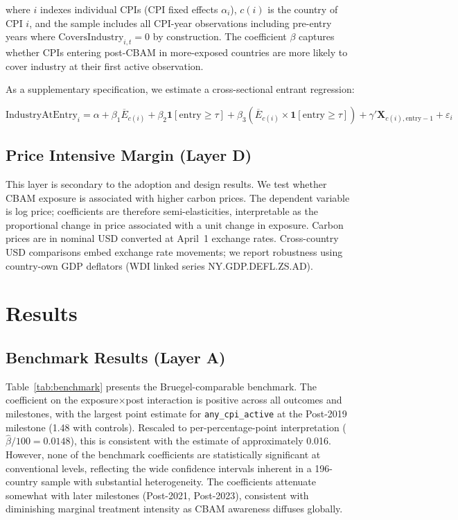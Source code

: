 \documentclass[12pt,a4paper]{article}
\begin{document}
\noindent where $i$ indexes individual CPIs (CPI fixed effects $\alpha_i$), $c(i)$ is the country of CPI $i$, and the sample includes all CPI-year observations including pre-entry years where $\text{CoversIndustry}_{i,t} = 0$ by construction. The coefficient $\beta$ captures whether CPIs entering post-CBAM in more-exposed countries are more likely to cover industry at their first active observation.

As a supplementary specification, we estimate a cross-sectional entrant regression:

\begin{equation}
\text{IndustryAtEntry}_i = \alpha + \beta_1 \overline{E}_{c(i)} + \beta_2 \mathbf{1}[\text{entry} \geq \tau] + \beta_3 \left( \overline{E}_{c(i)} \times \mathbf{1}[\text{entry} \geq \tau] \right) + \gamma' \mathbf{X}_{c(i),\text{entry}-1} + \varepsilon_i
\label{eq:entrant}
\end{equation}

\subsection{Price Intensive Margin (Layer D)}\label{sec:price_spec}

This layer is secondary to the adoption and design results. We test whether CBAM exposure is associated with higher carbon prices. The dependent variable is log price; coefficients are therefore semi-elasticities, interpretable as the proportional change in price associated with a unit change in exposure. Carbon prices are in nominal USD converted at April~1 exchange rates. Cross-country USD comparisons embed exchange rate movements; we report robustness using country-own GDP deflators (WDI linked series NY.GDP.DEFL.ZS.AD).


\section{Results}\label{sec:results}

\subsection{Benchmark Results (Layer A)}\label{sec:benchmark_results}

Table~\ref{tab:benchmark} presents the Bruegel-comparable benchmark. The coefficient on the exposure$\times$post interaction is positive across all outcomes and milestones, with the largest point estimate for \texttt{any\_cpi\_active} at the Post-2019 milestone (1.48 with controls). Rescaled to per-percentage-point interpretation ($\hat{\beta}/100 = 0.0148$), this is consistent with the \citet{Bahi2026} estimate of approximately 0.016. However, none of the benchmark coefficients are statistically significant at conventional levels, reflecting the wide confidence intervals inherent in a 196-country sample with substantial heterogeneity. The coefficients attenuate somewhat with later milestones (Post-2021, Post-2023), consistent with diminishing marginal treatment intensity as CBAM awareness diffuses globally.
\end{document}
